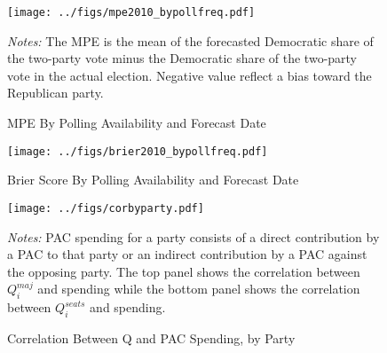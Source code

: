 \documentclass[12pt,final,fleqn]{article}
\theoremstyle{plain}
\begin{document}
\begin{figure}[!htb]
\begin{center}
\texttt{[image: ../figs/mpe2010\_bypollfreq.pdf]}
\vspace{.5cm}
\caption{MPE By Polling Availability and Forecast Date}
\label{fig:MPE By Polling Availability and Forecast Date}
\begin{minipage}{\linewidth}
\footnotesize
\emph{Notes:} The MPE is the mean of the forecasted Democratic share of the two-party vote minus the Democratic share of the two-party vote in the actual election. Negative value reflect a bias toward the Republican party.
\end{minipage}
\end{center}
\end{figure}

\begin{figure}[!htb]
\begin{center}
\texttt{[image: ../figs/brier2010\_bypollfreq.pdf]}
\vspace{.5cm}
\caption{Brier Score By Polling Availability and Forecast Date}
\label{fig:Brier Score By Polling Availability and Forecast Date}
\begin{minipage}{\linewidth}
\footnotesize
\end{minipage}
\end{center}
\end{figure}

\begin{figure}[!htb]
\texttt{[image: ../figs/corbyparty.pdf]}
\vspace{.5cm}
\caption{Correlation Between Q and PAC Spending, by Party}
\label{fig:Correlation Between Q and PAC Spending, by Party}
\begin{minipage}{\linewidth}
\footnotesize
\emph{Notes:} PAC spending for a party consists of a direct contribution by a PAC to that party or an indirect contribution by a PAC against the opposing party. The top panel shows the correlation between $Q_i^{maj}$ and spending while the bottom panel shows the correlation between $Q_i^{seats}$ and spending.
\end{minipage}
\end{figure}
\end{document}
